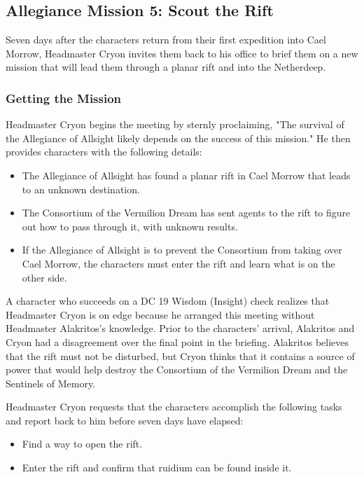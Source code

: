 \documentclass[10pt,a4paper,twoside,fancy,bg=print,twocolumn,openany,nodeprecatedcode]{dndbook}
\begin{document}
\subsection{Allegiance Mission 5: Scout the Rift}
Seven days after the characters return from their first expedition into Cael Morrow, Headmaster Cryon invites them back to his office to brief them on a new mission that will lead them through a planar rift and into the Netherdeep.

\subsubsection{Getting the Mission}
Headmaster Cryon begins the meeting by sternly proclaiming, "The survival of the Allegiance of Allsight likely depends on the success of this mission." He then provides characters with the following details:


\begin{itemize}
\item The Allegiance of Allsight has found a planar rift in Cael Morrow that leads to an unknown destination.
\item The Consortium of the Vermilion Dream has sent agents to the rift to figure out how to pass through it, with unknown results.
\item If the Allegiance of Allsight is to prevent the Consortium from taking over Cael Morrow, the characters must enter the rift and learn what is on the other side.
\end{itemize}

A character who succeeds on a DC 19 Wisdom (Insight) check realizes that Headmaster Cryon is on edge because he arranged this meeting without Headmaster Alakritos's knowledge. Prior to the characters' arrival, Alakritos and Cryon had a disagreement over the final point in the briefing. Alakritos believes that the rift must not be disturbed, but Cryon thinks that it contains a source of power that would help destroy the Consortium of the Vermilion Dream and the Sentinels of Memory.

Headmaster Cryon requests that the characters accomplish the following tasks and report back to him before seven days have elapsed:


\begin{itemize}
\item Find a way to open the rift.
\item Enter the rift and confirm that ruidium can be found inside it.
\end{itemize}
\end{document}
